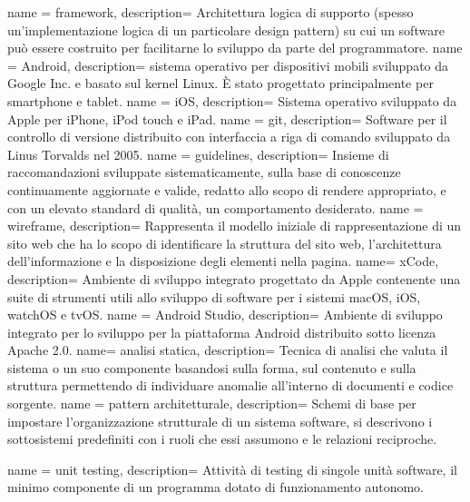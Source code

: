  {
  name = framework,
  description={
		Architettura logica di supporto (spesso un’implementazione logica di un particolare design pattern) su cui un software può essere costruito per facilitarne lo sviluppo da parte del programmatore.
	}
}
 {
  name = Android,
  description={
		sistema operativo per dispositivi mobili sviluppato da Google Inc. e basato sul kernel Linux. È stato progettato principalmente per smartphone e tablet.
	}
}
 {
  name = iOS,
  description={
		Sistema operativo sviluppato da Apple per iPhone, iPod touch e iPad.
	}
}
 {
  name = git,
  description={
		Software per il controllo di versione distribuito con interfaccia a riga di comando sviluppato da Linus Torvalds nel 2005.
	}
}
 {
  name = guidelines,
  description={
		  Insieme di raccomandazioni sviluppate sistematicamente, sulla base di conoscenze continuamente aggiornate e valide, redatto allo scopo di rendere appropriato, e con un elevato standard di qualità, un comportamento desiderato.
	}
}
 {
  name = wireframe,
  description={
		Rappresenta il modello iniziale di rappresentazione di un sito web che ha lo scopo di identificare la struttura del sito web, l'architettura dell'informazione e la disposizione degli elementi nella pagina.
	}
}
 {
  name= xCode,
  description={
		Ambiente di sviluppo integrato progettato da Apple contenente una suite di strumenti utili allo sviluppo di software per i sistemi macOS, iOS, watchOS e tvOS.
	}
}
 {
  name = Android Studio,
  description={
		Ambiente di sviluppo integrato per lo sviluppo per la piattaforma Android distribuito sotto licenza Apache 2.0.
	}
}
 {
  name= analisi statica,
  description={
		Tecnica di analisi che valuta il sistema o un suo componente basandosi sulla forma, sul contenuto e sulla struttura permettendo di individuare anomalie all'interno di documenti e codice sorgente.
	}
}
 {
  name = pattern architetturale,
  description={
		Schemi di base per impostare l'organizzazione strutturale di un sistema software, si descrivono i sottosistemi predefiniti con i ruoli che essi assumono e le relazioni reciproche.
	}
}

 {
  name = unit testing,
  description={
		Attività di testing di singole unità software, il minimo componente di un programma dotato di funzionamento autonomo.
	}
}

